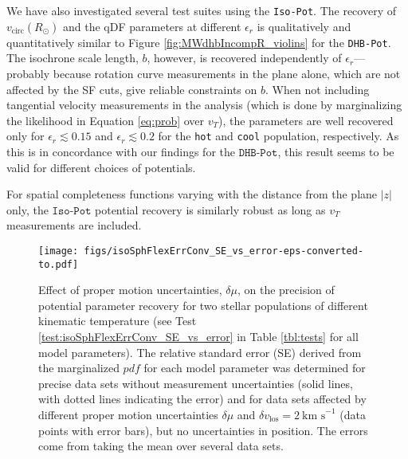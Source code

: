 \documentclass[iop,revtex4,numberedappendix,appendixfloats]{emulateapj}
\newcommand{\pdf}{\ensuremath{pdf}}
\begin{document}
We have also investigated several test suites using the \texttt{Iso-Pot}. The recovery of $v_\text{circ}(R_\odot)$ and the qDF parameters at different $\epsilon_r$ is qualitatively and quantitatively similar to Figure \ref{fig:MWdhbIncompR_violins} for the \texttt{DHB-Pot}. The isochrone scale length, $b$, however, is recovered independently of $\epsilon_r$---probably because rotation curve measurements in the plane alone, which are not affected by the SF cuts, give reliable constraints on $b$. When not including tangential velocity measurements in the analysis (which is done by marginalizing the likelihood in Equation \eqref{eq:prob} over $v_T$), the parameters are well recovered only for $\epsilon_r \lesssim 0.15$ and $\epsilon_r \lesssim 0.2$ for the \texttt{hot} and \texttt{cool} population, respectively. As this is in concordance with our findings for the $\texttt{DHB-Pot}$, this result seems to be valid for different choices of potentials.

For spatial completeness functions varying with the distance from the plane $|z|$ only, the $\texttt{Iso-Pot}$ potential recovery is similarly robust as long as $v_T$ measurements are included.

\begin{figure}[!htbp]
\centering
\texttt{[image: figs/isoSphFlexErrConv\_SE\_vs\_error-eps-converted-to.pdf]}
\caption{Effect of proper motion uncertainties, $\delta \mu$, on the precision of potential parameter recovery for two stellar populations of different kinematic temperature (see Test \ref{test:isoSphFlexErrConv_SE_vs_error} in Table \ref{tbl:tests} for all model parameters). The relative standard error (SE) derived from the marginalized \pdf{} for each model parameter was determined for precise data sets without measurement uncertainties (solid lines, with dotted lines indicating the error) and for data sets affected by different proper motion uncertainties $\delta \mu$ and $\delta v_\text{los}=2~\text{km s}^{-1}$ (data points with error bars), but no uncertainties in position. The errors come from taking the mean over several data sets.}
\label{fig:isoSphFlexErrConv_SE_vs_error}
\end{figure}
\end{document}
